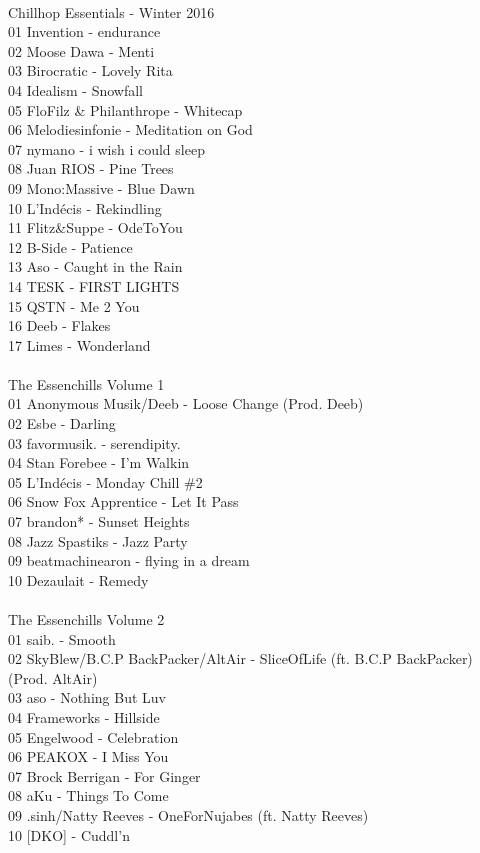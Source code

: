 \begin{multicols}{2}
\\ \large Chillhop Essentials - Winter 2016 \normalsize\\
 01 Invention - endurance\\ 02 Moose Dawa - Menti\\ 03 Birocratic - Lovely Rita\\ 04 Idealism - Snowfall\\ 05 FloFilz \& Philanthrope - Whitecap\\ 06 Melodiesinfonie - Meditation on God\\ 07 nymano - i wish i could sleep\\ 08 Juan RIOS - Pine Trees\\ 09 Mono:Massive - Blue Dawn\\ 10 L'Indécis - Rekindling\\ 11 Flitz\&Suppe - OdeToYou\\ 12 B-Side - Patience\\ 13 Aso - Caught in the Rain\\ 14 TESK - FIRST LIGHTS\\ 15 QSTN - Me 2 You\\ 16 Deeb - Flakes\\ 17 Limes - Wonderland\\
\\ \large The Essenchills Volume 1 \normalsize\\
 01 Anonymous Musik/Deeb - Loose Change (Prod. Deeb)\\ 02 Esbe - Darling\\ 03 favormusik. - serendipity.\\ 04 Stan Forebee - I'm Walkin\\ 05 L'Indécis - Monday Chill \#2\\ 06 Snow Fox Apprentice - Let It Pass\\ 07 brandon* - Sunset Heights\\ 08 Jazz Spastiks - Jazz Party\\ 09 beatmachinearon - flying in a dream\\ 10 Dezaulait - Remedy\\
\\ \large The Essenchills Volume 2 \normalsize\\
 01 saib. - Smooth\\ 02 SkyBlew/B.C.P BackPacker/AltAir - SliceOfLife (ft. B.C.P BackPacker) (Prod. AltAir)\\ 03 aso - Nothing But Luv\\ 04 Frameworks - Hillside\\ 05 Engelwood - Celebration\\ 06 PEAKOX - I Miss You\\ 07 Brock Berrigan - For Ginger\\ 08 aKu - Things To Come\\ 09 .sinh/Natty Reeves - OneForNujabes (ft. Natty Reeves)\\ 10 [DKO] - Cuddl'n\\
\\

\end{multicols}
